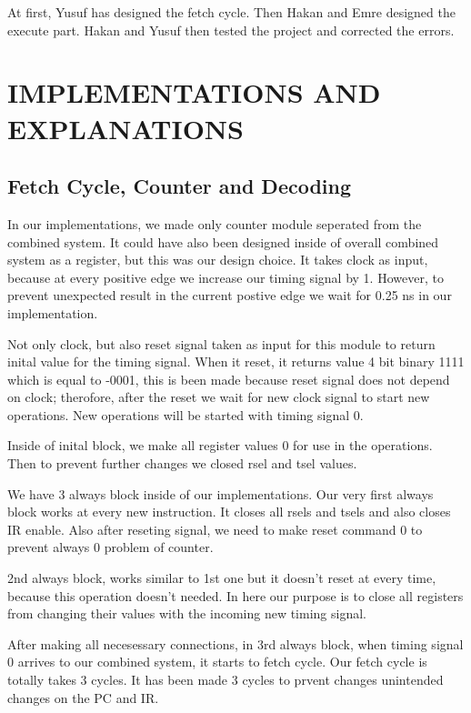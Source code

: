 \documentclass[pdftex,12pt,a4paper]{article}
\begin{document}
At first, Yusuf has designed the fetch cycle. Then Hakan and Emre designed the execute part. Hakan and Yusuf then tested the project and corrected the errors.


\section{IMPLEMENTATIONS AND EXPLANATIONS }
\subsection{Fetch Cycle, Counter and Decoding}
In our implementations, we made only counter module seperated from the 
combined system. It could have also been designed inside of overall 
combined system as a register, but this was our design choice. It takes 
clock as input, because at every positive edge we increase our timing signal
by 1. However, to prevent unexpected result in the current postive edge we wait for
0.25 ns in our implementation.

Not only clock, but also reset signal taken as input for this module
to return inital value for the timing signal. When it reset, it returns value 4 bit
binary 1111 which is equal to -0001, this is been made because reset signal 
does not depend on clock; therofore, after the reset we wait for new clock signal 
to start new operations. New operations will be started with timing signal 0.

Inside of inital block, we make all register values 0 for use in the operations.
Then to prevent further changes we closed rsel and tsel values.

We have 3 always block inside of our implementations. Our very first always
 block works at every new instruction. It closes all rsels and tsels and also
 closes IR enable. Also after reseting signal, we need to make reset command
 0 to prevent always 0 problem of counter.

2nd always block, works similar to 1st one but it doesn't reset at every time,
because this operation doesn't needed. In here our purpose is to close all
registers from changing their values with the incoming new timing signal.


After making all necesessary connections, in 3rd always block, when timing signal 0 
arrives to our combined system, it starts to fetch cycle. Our 
fetch cycle is totally takes 3 cycles. It has been made 3 cycles to prvent 
changes unintended changes on the PC and IR.
\end{document}
